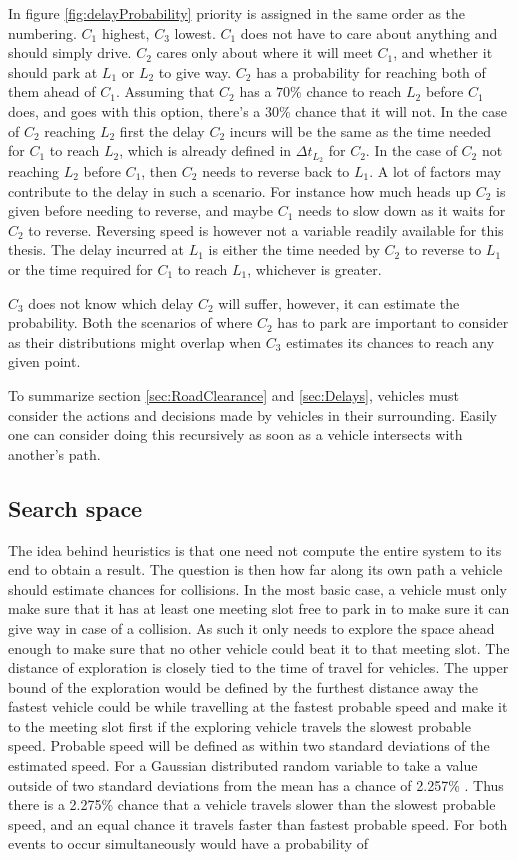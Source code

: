 \documentclass{article}
\begin{document}
			In figure \ref{fig:delayProbability} priority is assigned in the same order as the numbering. $C_1$ highest, $C_3$ lowest. $C_1$ does not have to care about anything and should simply drive. $C_2$ cares only about where it will meet $C_1$, and whether it should park at $L_1$ or $L_2$ to give way. $C_2$ has a probability for reaching both of them ahead of $C_1$. Assuming that $C_2$ has a $70\%$ chance to reach $L_2$ before $C_1$ does, and goes with this option, there's a $30\%$ chance that it will not. In the case of $C_2$ reaching $L_2$ first the delay $C_2$ incurs will be the same as the time needed for $C_1$ to reach $L_2$, which is already defined in $\Delta{t_{L_2}}$ for $C_2$. In the case of $C_2$ not reaching $L_2$ before $C_1$, then $C_2$ needs to reverse back to $L_1$. A lot of factors may contribute to the delay in such a scenario. For instance how much heads up $C_2$ is given before needing to reverse, and maybe $C_1$ needs to slow down as it waits for $C_2$ to reverse. Reversing speed is however not a variable readily available for this thesis. The delay incurred at $L_1$ is either the time needed by $C_2$ to reverse to $L_1$ or the time required for $C_1$ to reach $L_1$, whichever is greater.

			$C_3$ does not know which delay $C_2$ will suffer, however, it can estimate the probability. Both the scenarios of where $C_2$ has to park are important to consider as their distributions might overlap when $C_3$ estimates its chances to reach any given point.

			To summarize section \ref{sec:RoadClearance} and \ref{sec:Delays}, vehicles must consider the actions and decisions made by vehicles in their surrounding. Easily one can consider doing this recursively as soon as a vehicle intersects with another's path.

		\subsection{Search space}
			The idea behind heuristics is that one need not compute the entire system to its end to obtain a result. The question is then how far along its own path a vehicle should estimate chances for collisions. In the most basic case, a vehicle must only make sure that it has at least one meeting slot free to park in to make sure it can give way in case of a collision. As such it only needs to explore the space ahead enough to make sure that no other vehicle could beat it to that meeting slot. The distance of exploration is closely tied to the time of travel for vehicles. The upper bound of the exploration would be defined by the furthest distance away the fastest vehicle could be while travelling at the fastest probable speed and make it to the meeting slot first if the exploring vehicle travels the slowest probable speed. Probable speed will be defined as within two standard deviations of the estimated speed. For a Gaussian distributed random variable to take a value outside of two standard deviations from the mean has a chance of 2.257\% \cite{matstat}. Thus there is a 2.275\% chance that a vehicle travels slower than the slowest probable speed, and an equal chance it travels faster than fastest probable speed. For both events to occur simultaneously would have a probability of
\end{document}
